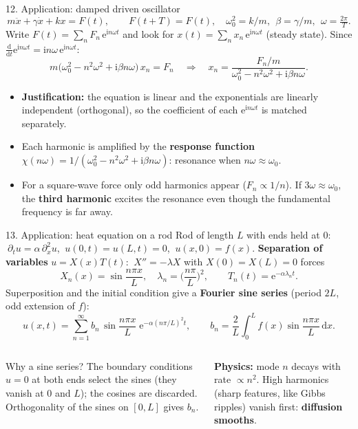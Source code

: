 \documentclass[aspectratio=169,10pt]{beamer}
\newcommand{\ii}{\mathrm{i}}
\newcommand{\ee}{\mathrm{e}}
\newcommand{\dd}{\,\mathrm{d}}
\begin{document}
\begin{frame}{12. Application: damped driven oscillator}
  \small
  \[
    m\ddot x+\gamma\dot x+kx=F(t),\qquad F(t+T)=F(t),\quad \omega_0^2=k/m,\ \ \beta=\gamma/m,\ \ \omega=\tfrac{2\pi}{T}.
  \]
  Write $F(t)=\sum_n F_n\,\ee^{\ii n\omega t}$ and look for $x(t)=\sum_n x_n\,\ee^{\ii n\omega t}$ (steady state). Since $\frac{\mathrm d}{\mathrm dt}\ee^{\ii n\omega t}=\ii n\omega\,\ee^{\ii n\omega t}$:
  \[
    m\big(\omega_0^2-n^2\omega^2+\ii\beta n\omega\big)\,x_n=F_n
    \quad\Longrightarrow\quad
    x_n=\frac{F_n/m}{\omega_0^2-n^2\omega^2+\ii\beta n\omega}.
  \]
  \begin{itemize}
    \item \textbf{Justification:} the equation is linear and the exponentials are linearly independent (orthogonal), so the coefficient of each $\ee^{\ii n\omega t}$ is matched separately.
    \item Each harmonic is amplified by the \textbf{response function} $\chi(n\omega)=1/(\omega_0^2-n^2\omega^2+\ii\beta n\omega)$: resonance when $n\omega\approx\omega_0$.
    \item For a square-wave force only odd harmonics appear ($F_n\propto1/n$). If $3\omega\approx\omega_0$, the \textbf{third harmonic} excites the resonance even though the fundamental frequency is far away.
  \end{itemize}
\end{frame}

\begin{frame}{13. Application: heat equation on a rod}
  \small
  Rod of length $L$ with ends held at $0$: $\ \partial_t u=\alpha\,\partial_x^2u$, $\ u(0,t)=u(L,t)=0$, $\ u(x,0)=f(x)$.
  \textbf{Separation of variables} $u=X(x)T(t)$: $\ X''=-\lambda X$ with $X(0)=X(L)=0$ forces
  \[
    X_n(x)=\sin\frac{n\pi x}{L},\quad\lambda_n=\Big(\frac{n\pi}{L}\Big)^2,\qquad T_n(t)=\ee^{-\alpha\lambda_n t}.
  \]
  Superposition and the initial condition give a \textbf{Fourier sine series} (period $2L$, odd extension of $f$):
  \[
    u(x,t)=\sum_{n=1}^{\infty}b_n\,\sin\frac{n\pi x}{L}\;\ee^{-\alpha(n\pi/L)^2t},\qquad
    b_n=\frac2L\int_0^L f(x)\sin\frac{n\pi x}{L}\dd x .
  \]
  \begin{columns}[T]
    \begin{keybox}{Why a sine series?}
      \footnotesize The boundary conditions $u=0$ at both ends select the sines (they vanish at $0$ and $L$); the cosines are discarded. Orthogonality of the sines on $[0,L]$ gives $b_n$.
    \end{keybox}
    \textbf{Physics:} mode $n$ decays with rate $\propto n^2$. High harmonics (sharp features, like Gibbs ripples) vanish first: \textbf{diffusion smooths}.
  \end{columns}
\end{frame}
\end{document}
